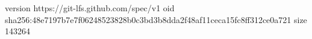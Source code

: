 version https://git-lfs.github.com/spec/v1
oid sha256:48e7197b7e7f06248523828b0c3bd3b8dda2f48af11ceca15fc8ff312ce0a721
size 143264
